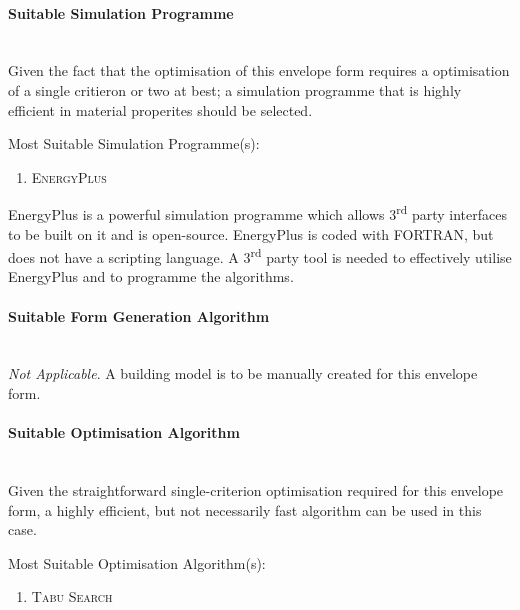 \paragraph{Suitable Simulation Programme}\mbox{}\\

Given the fact that the optimisation of this envelope form requires a optimisation of a single critieron or two at best; a simulation programme that is highly efficient in material properites should be selected.

Most Suitable Simulation Programme(s):
\vspace{-0.3cm}
\begin{enumerate}
	\item \textsc{EnergyPlus}
\end{enumerate}

EnergyPlus is a powerful simulation programme which allows 3\textsuperscript{rd} party interfaces to be built on it and is open-source. EnergyPlus is coded with FORTRAN, but does not have a scripting language. A 3\textsuperscript{rd} party tool is needed to effectively utilise EnergyPlus and to programme the algorithms.

\paragraph{Suitable Form Generation Algorithm}\mbox{}\\

\emph{Not Applicable}. A building model is to be manually created for this envelope form.

\paragraph{Suitable Optimisation Algorithm}\mbox{}\\

Given the straightforward single-criterion optimisation required for this envelope form, a highly efficient, but not necessarily fast algorithm can be used in this case.

Most Suitable Optimisation Algorithm(s):
\vspace{-0.3cm}
\begin{enumerate}
	\item \textsc{Tabu Search}
\end{enumerate}
